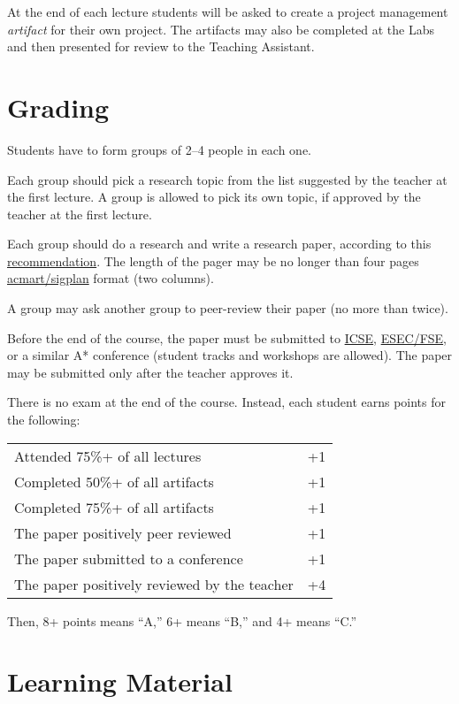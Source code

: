 \documentclass[nobrand,anonymous,nodate,nosecurity]{huawei}
\begin{document}
{At the end of each lecture students will be asked to create a project management \emph{artifact} for
their own project. The artifacts may also be completed at the Labs and then presented
for review to the Teaching Assistant.

\newpage
\section*{Grading}

Students have to form groups of 2--4 people in each one.

Each group should pick a research topic from the list suggested by the teacher
at the first lecture. A group is allowed to pick its own topic, if approved
by the teacher at the first lecture.

Each group should do a research and write a research paper, according
to this \href{https://www.yegor256.com/2022/08/24/research-paper-template.html}{recommendation}.
The length of the pager may be no longer than four pages
\href{https://ctan.org/pkg/acmart}{acmart/sigplan} format (two columns).

A group may ask another group to peer-review their paper
(no more than twice).

Before the end of the course, the paper must be submitted
to \href{http://www.icse-conferences.org/}{ICSE},
\href{https://www.esec-fse.org/}{ESEC/FSE}, or a similar A* conference
(student tracks and workshops are allowed).
The paper may be submitted only after the teacher approves it.

There is no exam at the end of the course. Instead,
each student earns points for the following:\\
\renewcommand{\arraystretch}{1}
\begin{tabular}{lr}
Attended 75\%+ of all lectures & +1 \\
Completed 50\%+ of all artifacts & +1 \\
Completed 75\%+ of all artifacts & +1 \\
The paper positively peer reviewed & +1 \\
The paper submitted to a conference & +1 \\
The paper positively reviewed by the teacher & +4 \\
\end{tabular}

Then, 8+ points means ``A,'' 6+ means ``B,'' and 4+ means ``C.''

\newpage
\section*{Learning Material}

}
\end{document}
